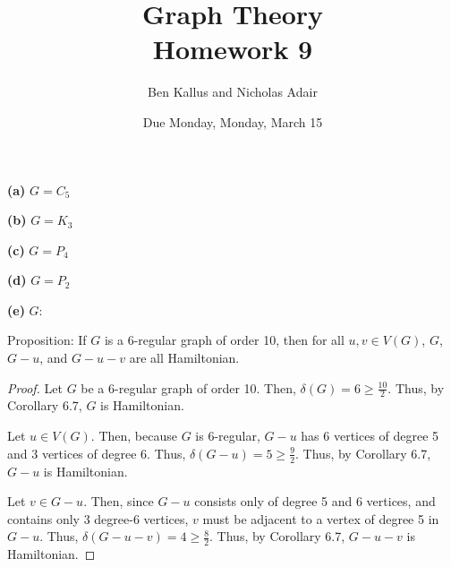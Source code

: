 \documentclass[12pt]{article}
\title{Graph Theory \\ Homework 9}
\author{Ben Kallus and Nicholas Adair}
\date{Due Monday, Monday, March 15}
\begin{document}
\maketitle


{\bf (a)} $G = C_5$

{\bf (b)} $G = K_3$

{\bf (c)} $G = P_4$

{\bf (d)} $G = P_2$

{\bf (e)} $G:$

\newpage{}


\newpage{} Proposition: If $G$ is a 6-regular graph of order 10, then for all $u,v \in V(G)$, $G$, $G - u$, and $G - u - v$ are all Hamiltonian.
\begin{proof}
	Let $G$ be a 6-regular graph of order 10.
	Then, $\delta(G) = 6 \geq \frac{10}2$.
	Thus, by Corollary 6.7, $G$ is Hamiltonian.

	Let $u \in V(G)$.
	Then, because $G$ is 6-regular, $G-u$ has 6 vertices of degree 5 and 3 vertices of degree 6.
	Thus, $\delta(G-u) = 5 \geq \frac{9}2$.
	Thus, by Corollary 6.7, $G-u$ is Hamiltonian.

	Let $v \in G-u$.
	Then, since $G-u$ consists only of degree 5 and 6 vertices, and contains only 3 degree-6 vertices, $v$ must be adjacent to a vertex of degree 5 in $G-u$.
	Thus, $\delta(G - u - v) = 4 \geq \frac{8}{2}$.
	Thus, by Corollary 6.7, $G-u-v$ is Hamiltonian.
\end{proof}

\newpage{}
\end{document}
